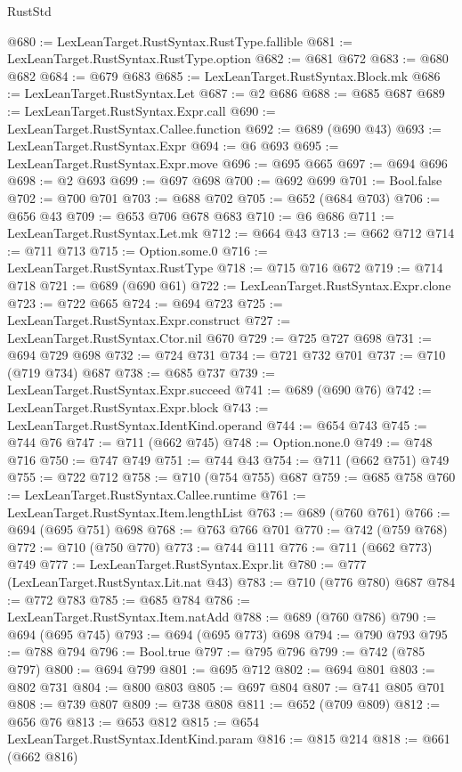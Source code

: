 \begin{lexlean}{RustStd}
\begin{coremodule}
@680 := LexLeanTarget.RustSyntax.RustType.fallible
@681 := LexLeanTarget.RustSyntax.RustType.option
@682 := @681 @672
@683 := @680 @682
@684 := @679 @683
@685 := LexLeanTarget.RustSyntax.Block.mk
@686 := LexLeanTarget.RustSyntax.Let
@687 := @2 @686
@688 := @685 @687
@689 := LexLeanTarget.RustSyntax.Expr.call
@690 := LexLeanTarget.RustSyntax.Callee.function
@692 := @689 (@690 @43)
@693 := LexLeanTarget.RustSyntax.Expr
@694 := @6 @693
@695 := LexLeanTarget.RustSyntax.Expr.move
@696 := @695 @665
@697 := @694 @696
@698 := @2 @693
@699 := @697 @698
@700 := @692 @699
@701 := Bool.false
@702 := @700 @701
@703 := @688 @702
@705 := @652 (@684 @703)
@706 := @656 @43
@709 := @653 @706 @678 @683
@710 := @6 @686
@711 := LexLeanTarget.RustSyntax.Let.mk
@712 := @664 @43
@713 := @662 @712
@714 := @711 @713
@715 := Option.some.{0}
@716 := LexLeanTarget.RustSyntax.RustType
@718 := @715 @716 @672
@719 := @714 @718
@721 := @689 (@690 @61)
@722 := LexLeanTarget.RustSyntax.Expr.clone
@723 := @722 @665
@724 := @694 @723
@725 := LexLeanTarget.RustSyntax.Expr.construct
@727 := LexLeanTarget.RustSyntax.Ctor.nil @670
@729 := @725 @727 @698
@731 := @694 @729 @698
@732 := @724 @731
@734 := @721 @732 @701
@737 := @710 (@719 @734) @687
@738 := @685 @737
@739 := LexLeanTarget.RustSyntax.Expr.succeed
@741 := @689 (@690 @76)
@742 := LexLeanTarget.RustSyntax.Expr.block
@743 := LexLeanTarget.RustSyntax.IdentKind.operand
@744 := @654 @743
@745 := @744 @76
@747 := @711 (@662 @745)
@748 := Option.none.{0}
@749 := @748 @716
@750 := @747 @749
@751 := @744 @43
@754 := @711 (@662 @751) @749
@755 := @722 @712
@758 := @710 (@754 @755) @687
@759 := @685 @758
@760 := LexLeanTarget.RustSyntax.Callee.runtime
@761 := LexLeanTarget.RustSyntax.Item.lengthList
@763 := @689 (@760 @761)
@766 := @694 (@695 @751) @698
@768 := @763 @766 @701
@770 := @742 (@759 @768)
@772 := @710 (@750 @770)
@773 := @744 @111
@776 := @711 (@662 @773) @749
@777 := LexLeanTarget.RustSyntax.Expr.lit
@780 := @777 (LexLeanTarget.RustSyntax.Lit.nat @43)
@783 := @710 (@776 @780) @687
@784 := @772 @783
@785 := @685 @784
@786 := LexLeanTarget.RustSyntax.Item.natAdd
@788 := @689 (@760 @786)
@790 := @694 (@695 @745)
@793 := @694 (@695 @773) @698
@794 := @790 @793
@795 := @788 @794
@796 := Bool.true
@797 := @795 @796
@799 := @742 (@785 @797)
@800 := @694 @799
@801 := @695 @712
@802 := @694 @801
@803 := @802 @731
@804 := @800 @803
@805 := @697 @804
@807 := @741 @805 @701
@808 := @739 @807
@809 := @738 @808
@811 := @652 (@709 @809)
@812 := @656 @76
@813 := @653 @812
@815 := @654 LexLeanTarget.RustSyntax.IdentKind.param
@816 := @815 @214
@818 := @661 (@662 @816)

\end{coremodule}
\end{lexlean}
